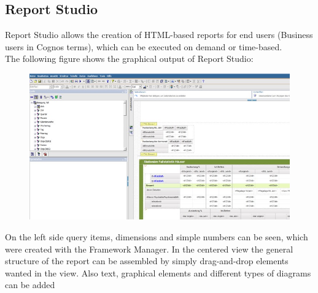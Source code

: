 \documentclass[a4paper]{article}
\begin{document}
	\subsection{Report Studio}
	Report Studio allows the creation of HTML-based reports for end users
	(Business users in Cognos terms), which can be executed on demand or
	time-based.\\
	The following figure shows the graphical output of Report Studio: 
	\begin{figure}[!ht]
		  \centering
		      \includegraphics[width=1.0\textwidth]{ReportStudio_2}
		  \caption{}
	\end{figure}
	On the left side query items, dimensions and simple numbers can be seen, which
	were created with the Framework Manager. In the centered view the general
	structure of the report can be assembled by simply drag-and-drop
	elements wanted in the view. Also text, graphical elements and different types
	of diagrams can be added
\end{document}
